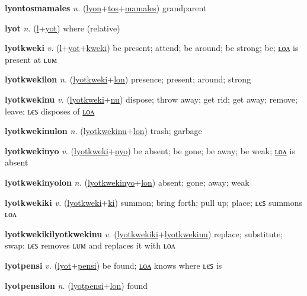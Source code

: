 \textbf{\hypertarget{lyontosmamales}{lyontosmamales}} \textit{n.} (\hyperlink{lyon}{lyon}+\allowbreak \hyperlink{tos}{tos}+\allowbreak \hyperlink{mamales}{mamales})
grandparent

\textbf{\hypertarget{lyot}{lyot}} \textit{n.} (\hyperlink{l}{l}+\allowbreak \hyperlink{yot}{yot})
where (relative)

\textbf{\hypertarget{lyotkweki}{lyotkweki}} \textit{v.} (\hyperlink{l}{l}+\allowbreak \hyperlink{yot}{yot}+\allowbreak \hyperlink{kweki}{kweki})
be present; attend; be around; be strong; be; \hyperlink{lyotkwekilon}{ʟᴏᴧ} is present at ʟᴜᴍ

\textbf{\hypertarget{lyotkwekilon}{lyotkwekilon}} \textit{n.} (\hyperlink{lyotkweki}{lyotkweki}+\allowbreak \hyperlink{lon}{lon})
presence; present; around; strong

\textbf{\hypertarget{lyotkwekinu}{lyotkwekinu}} \textit{v.} (\hyperlink{lyotkweki}{lyotkweki}+\allowbreak \hyperlink{nu}{nu})
dispose; throw away; get rid; get away; remove; leave; ʟєꜱ disposes of \hyperlink{lyotkwekinulon}{ʟᴏᴧ}

\textbf{\hypertarget{lyotkwekinulon}{lyotkwekinulon}} \textit{n.} (\hyperlink{lyotkwekinu}{lyotkwekinu}+\allowbreak \hyperlink{lon}{lon})
trash; garbage

\textbf{\hypertarget{lyotkwekinyo}{lyotkwekinyo}} \textit{v.} (\hyperlink{lyotkweki}{lyotkweki}+\allowbreak \hyperlink{nyo}{nyo})
be absent; be gone; be away; be weak; \hyperlink{lyotkwekinyolon}{ʟᴏᴧ} is absent

\textbf{\hypertarget{lyotkwekinyolon}{lyotkwekinyolon}} \textit{n.} (\hyperlink{lyotkwekinyo}{lyotkwekinyo}+\allowbreak \hyperlink{lon}{lon})
absent; gone; away; weak

\textbf{\hypertarget{lyotkwekiki}{lyotkwekiki}} \textit{v.} (\hyperlink{lyotkweki}{lyotkweki}+\allowbreak \hyperlink{ki}{ki})
summon; bring forth; pull up; place; ʟєꜱ summons ʟᴏᴧ

\textbf{\hypertarget{lyotkwekikilyotkwekinu}{lyotkwekikilyotkwekinu}} \textit{v.} (\hyperlink{lyotkwekiki}{lyotkwekiki}+\allowbreak \hyperlink{lyotkwekinu}{lyotkwekinu})
replace; substitute; swap; ʟєꜱ removes ʟᴜᴍ and replaces it with ʟᴏᴧ

\textbf{\hypertarget{lyotpensi}{lyotpensi}} \textit{v.} (\hyperlink{lyot}{lyot}+\allowbreak \hyperlink{pensi}{pensi})
be found; \hyperlink{lyotpensilon}{ʟᴏᴧ} knows where ʟєꜱ is

\textbf{\hypertarget{lyotpensilon}{lyotpensilon}} \textit{n.} (\hyperlink{lyotpensi}{lyotpensi}+\allowbreak \hyperlink{lon}{lon})
found

